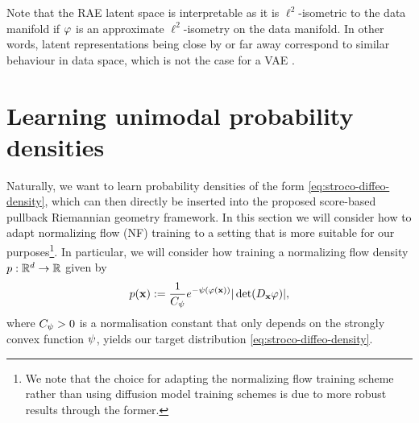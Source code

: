 \begin{remark}
\label{rem:interpretability-rae}
    Note that the RAE latent space is interpretable as it is $\ell^2$-isometric to the data manifold if $\varphi$ is an approximate $\ell^2$-isometry on the data manifold. In other words, latent representations being close by or far away correspond to similar behaviour in data space, which is not the case for a VAE \cite{kingma2013auto}.
\end{remark}

\section{Learning unimodal probability densities }
\label{sec:adapting-normalizing-flows}

Naturally, we want to learn probability densities of the form \ref{eq:stroco-diffeo-density}, which can then directly be inserted into the proposed score-based pullback Riemannian geometry framework. In this section we will consider how to adapt normalizing flow (NF) \cite{dinh2017density} training to a setting that is more suitable for our purposes\footnote{We note that the choice for adapting the normalizing flow training scheme rather than using diffusion model training schemes is due to more robust results through the former.}. In particular, we will consider how training a normalizing flow density $p: \mathbb{R}^d\to\mathbb{R}$ given by 
\begin{equation}
    p(\mathbf{x}):= \frac{1}{C_{\psi}}e^{- \psi(\varphi(\mathbf{x}))} |\det(D_{\mathbf{x}} \varphi)|,
    \label{eq:nf-density}
\end{equation}
where $C_{\psi}>0$ is a normalisation constant that only depends on the strongly convex function $\psi$, yields our target distribution \ref{eq:stroco-diffeo-density}.

